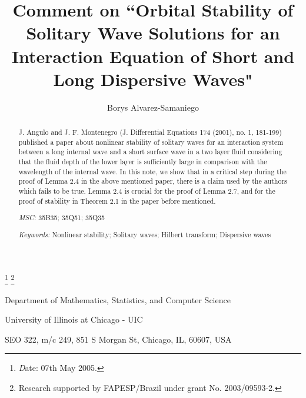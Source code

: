 \documentclass[10pt,reqno]{amsart}
\numberwithin{equation}{section}
\begin{document}
\title[Stability for a long-short wave interaction.]
{Comment on ``Orbital Stability of Solitary Wave Solutions for an 
Interaction Equation of Short and Long Dispersive Waves"}

\setlength{\baselineskip}{1.3\baselineskip}
\author[Borys Alvarez-Samaniego]{Borys Alvarez-Samaniego}







\thanks{{\textit Date}: 07th May 2005.}
\thanks{Research supported by FAPESP/Brazil under grant No. 2003/09593-2.}


\maketitle


{\scriptsize
 \centerline{Department of Mathematics, Statistics, and Computer Science} 
 \centerline{University of Illinois at Chicago - UIC} 
 \centerline{SEO 322, m/c 249, 851 S Morgan St, Chicago, IL, 60607, USA}}


\begin{abstract}
  J. Angulo and J. F. Montenegro (J. Differential Equations 174 (2001), no. 1, 
  181-199) published a paper about nonlinear stability of 
  solitary waves for an interaction system between a long internal wave 
  and a short surface wave in a two layer fluid considering that the fluid 
  depth of the lower layer is sufficiently large in comparison with the 
  wavelength of the internal wave.  In this note, we show that in a critical 
  step during the proof of  Lemma 2.4 in the above mentioned paper, there is a 
  claim used by the authors which fails to be true.  Lemma 2.4 is crucial 
  for the proof of Lemma 2.7, and for the proof of stability 
  in Theorem 2.1 in the paper before mentioned.  

\vspace{0.5cm}
\noindent
{\textit{MSC:}} 35B35; 35Q51; 35Q35

\vspace{0.5cm}  
\noindent
{\textit{Keywords:}} Nonlinear stability; Solitary waves; Hilbert
transform; Dispersive waves
  
\end{abstract}
\end{document}

